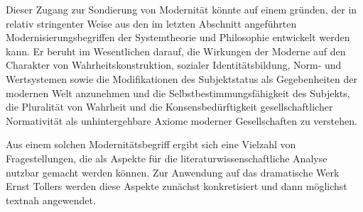 Dieser Zugang zur Sondierung von Modernität könnte auf einem \Cite{normativen
  Begriff von Modernität und modernem
  Bewußtsein} gründen, der in relativ
stringenter Weise aus den im letzten Abschnitt angeführten
Modernisierungsbegriffen der Systemtheorie und Philosophie entwickelt werden
kann. Er beruht im Wesentlichen darauf, die Wirkungen der Moderne auf den
Charakter von Wahrheitskonstruktion, sozialer Identitätsbildung, Norm- und
Wertsystemen sowie die Modifikationen des Subjektstatus als Gegebenheiten der
modernen Welt anzunehmen und die Selbstbestimmungsfähigkeit des Subjekts, die
Pluralität von Wahrheit und die Konsensbedürftigkeit gesellschaftlicher
Normativität als unhintergehbare Axiome moderner Gesellschaften zu verstehen.

Aus einem solchen Modernitätsbegriff ergibt sich eine Vielzahl von
Fragestellungen, die als Aspekte für die literaturwissenschaftliche Analyse
nutzbar gemacht werden können. Zur Anwendung auf das dramatische Werk Ernst
Tollers werden diese Aspekte zunächst konkretisiert und dann möglichst textnah
angewendet.


